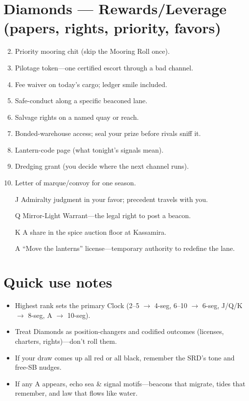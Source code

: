\section*{Diamonds --- Rewards/Leverage (papers, rights, priority, favors)}
\label{sec:kahfagia-rewards}
\begin{enumerate}
\setcounter{enumi}{1}
\item Priority mooring chit (skip the Mooring Roll once).
\item Pilotage token---one certified escort through a bad channel.
\item Fee waiver on today's cargo; ledger smile included.
\item Safe-conduct along a specific beaconed lane.
\item Salvage rights on a named quay or reach.
\item Bonded-warehouse access; seal your prize before rivals sniff it.
\item Lantern-code page (what tonight's signals mean).
\item Dredging grant (you decide where the next channel runs).
\item Letter of marque/convoy for one season.
\item[J] Admiralty judgment in your favor; precedent travels with you.
\item[Q] Mirror-Light Warrant---the legal right to post a beacon.
\item[K] A share in the spice auction floor at Kassamira.
\item[A] ``Move the lanterns'' license---temporary authority to redefine the lane.
\end{enumerate}

\section*{Quick use notes}
\label{sec:kahfagia-quick-use}
\begin{itemize}
\item Highest rank sets the primary Clock (2--5 $\rightarrow$ 4-seg, 6--10 $\rightarrow$ 6-seg, J/Q/K $\rightarrow$ 8-seg, A $\rightarrow$ 10-seg).
\item Treat Diamonds as position-changers and codified outcomes (licenses, charters, rights)---don't roll them.
\item If your draw comes up all red or all black, remember the SRD's tone and free-SB nudges.
\item If any A appears, echo sea \& signal motifs---beacons that migrate, tides that remember, and law that flows like water.
\end{itemize}


